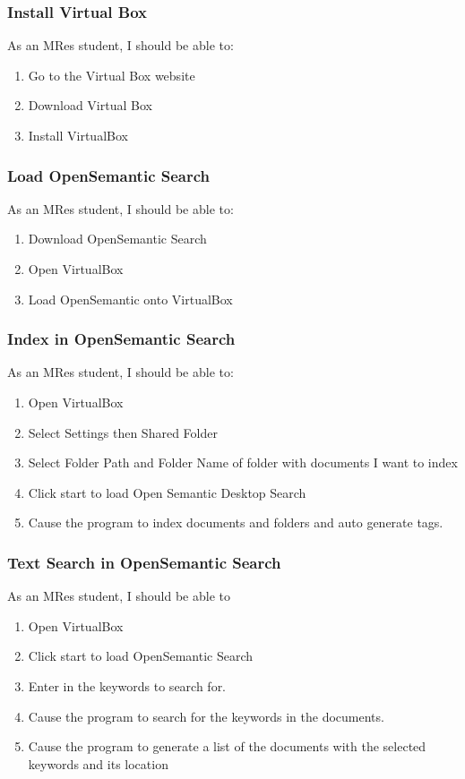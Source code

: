 \documentclass{article}
\begin{document}
\subsubsection*{Install Virtual Box}
As an MRes student, I should be able to:
\begin{enumerate}
\item Go to the Virtual Box website
\item Download Virtual Box
\item Install VirtualBox
\end{enumerate}

\subsubsection*{Load OpenSemantic Search}

As an MRes student, I should be able to:
\begin{enumerate}
\item Download OpenSemantic Search
\item Open VirtualBox
\item Load OpenSemantic onto VirtualBox
\end{enumerate}

\subsubsection*{Index in OpenSemantic Search}

As an MRes student, I should be able to:
\begin{enumerate}
\item Open VirtualBox
\item Select Settings then Shared Folder
\item Select Folder Path and Folder Name of folder with documents I want to index
\item Click start to load Open Semantic Desktop Search
\item Cause the program to index documents and folders and auto generate tags.
\end{enumerate}

\subsubsection*{Text Search in OpenSemantic Search}

As an MRes student, I should be able to
\begin{enumerate}
\item Open VirtualBox
\item Click start to load OpenSemantic Search
\item Enter in the keywords to search for.
\item Cause the program to search for the keywords in the documents.
\item Cause the program to generate a list of the documents with the selected keywords and its location
\end{enumerate}
\end{document}
